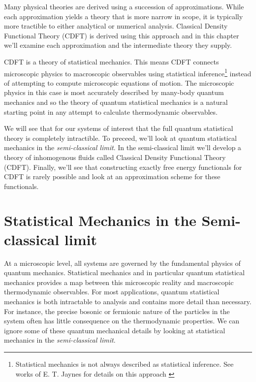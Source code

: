 \label{chapter:cdft_intro}

Many physical theories are derived using a succession of approximations. While
each approximation yields a theory that is more narrow in scope, it is
typically more tractible to either analytical or numerical analysis.  Classical
Density Functional Theory (CDFT) is derived using this approach and in this
chapter we'll examine each approximation and the intermediate theory they
supply. 

CDFT is a theory of statistical mechanics. This means CDFT connects microscopic
physics to macroscopic observables using statistical
inference\footnote{Statistical mechanics is not always described as statistical
inference. See works of E. T. Jaynes for details on this approach
\cite{JAYNES57}} instead of attempting to compute microscopic equations of
motion. The microscopic physics in this case is most accurately described by
many-body quantum mechanics and so the theory of quantum statistical mechanics
is a natural starting point in any attempt to calculate thermodynamic
observables.

We will see that for our systems of interest that the full quantum statistical
theory is completely intractible. To preceed, we'll look at quantum statistical
mechanics in the \textit{semi-classical limit}. In the semi-classical limit
we'll develop a theory of inhomogenous fluids called Classical Density
Functional Theory (CDFT). Finally, we'll see that constructing exactly free
energy functionals for CDFT is rarely possible and look at an approximation
scheme for these functionals.

\section{Statistical Mechanics in the Semi-classical limit} %

At a microscopic level, all systems are governed by the fundamental physics of
quantum mechanics. Statistical mechanics and in particular quantum statistical
mechanics provides a map between this microscopic reality and macroscopic
thermodynamic observables. For most applications, quantum statistical mechanics
is both intractable to analysis and contains more detail than necessary. For
instance, the precise bosonic or fermionic nature of the particles in the
system often has little consequence on the thermodynamic properties.  We can
ignore some of these quantum mechanical details by looking at statistical
mechanics in the \textit{semi-classical limit}.

